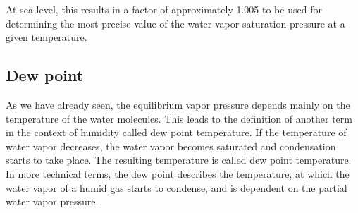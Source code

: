 At sea level, this results in a factor of approximately \num{1.005} to be used for determining the most precise value of the water vapor saturation pressure at a given temperature.

\subsection{Dew point}
As we have already seen, the equilibrium vapor pressure depends mainly on the temperature of the water molecules. This leads to the definition of another term in the context of humidity called dew point temperature. If the temperature of water vapor decreases, the water vapor becomes saturated and condensation starts to take place. The resulting temperature is called dew point temperature. In more technical terms, the dew point describes the temperature, at which the water vapor of a humid gas starts to condense, and is dependent on the partial water vapor pressure.

